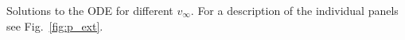 \label{fig:v_infty}
Solutions to the ODE for different $v_\infty$. For a description of the individual panels see Fig.~\ref{fig:p_ext}.